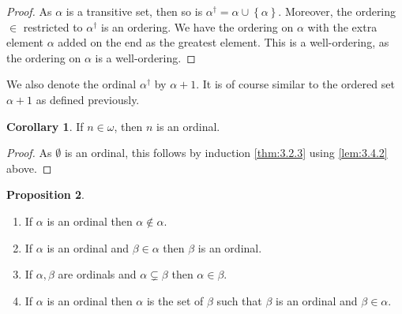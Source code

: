 \documentclass{article}
\newcommand{\cb}[1]{\left\{ #1 \right\}}
\theoremstyle{definition}\newtheorem{definition}{Definition}[subsection]
\theoremstyle{definition}\newtheorem{remark}[definition]{Remark}
\theoremstyle{definition}\newtheorem*{example}{Example}
\theoremstyle{definition}\newtheorem*{note}{Note}
\newtheorem{proposition}[definition]{Proposition}
\newtheorem{corollary}[definition]{Corollary}
\begin{document}
\begin{proof}
As $ \alpha $ is a transitive set, then so is $ \alpha^\dagger = \alpha \cup \cb{\alpha} $. Moreover, the ordering $ \in $ restricted to $ \alpha^\dagger $ is an ordering. We have the ordering on $ \alpha $ with the extra element $ \alpha $ added on the end as the greatest element. This is a well-ordering, as the ordering on $ \alpha $ is a well-ordering.
\end{proof}

We also denote the ordinal $ \alpha^\dagger $ by $ \alpha + 1 $. It is of course similar to the ordered set $ \alpha + 1 $ as defined previously.

\begin{corollary}
If $ n \in \omega $, then $ n $ is an ordinal.
\end{corollary}

\begin{proof}
As $ \emptyset $ is an ordinal, this follows by induction \ref{thm:3.2.3} using \ref{lem:3.4.2} above.
\end{proof}

\begin{proposition}
\label{prop:3.4.4}
\hfill
\begin{enumerate}
\item If $ \alpha $ is an ordinal then $ \alpha \notin \alpha $.
\item If $ \alpha $ is an ordinal and $ \beta \in \alpha $ then $ \beta $ is an ordinal.
\item If $ \alpha, \beta $ are ordinals and $ \alpha \subsetneq \beta $ then $ \alpha \in \beta $.
\item If $ \alpha $ is an ordinal then $ \alpha $ is the set of $ \beta $ such that $ \beta $ is an ordinal and $ \beta \in \alpha $.
\end{enumerate}
\end{proposition}
\end{document}
